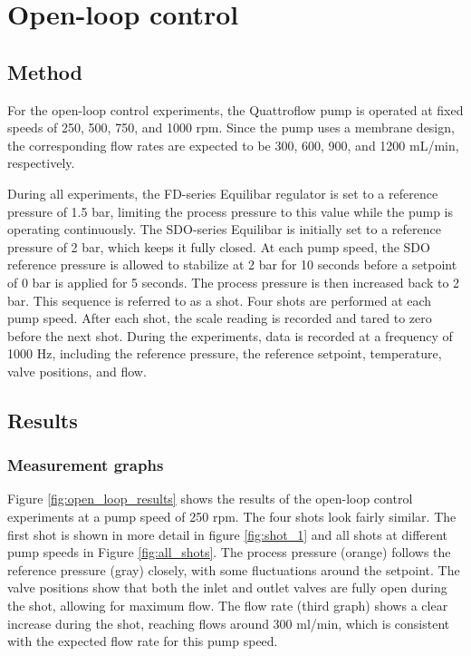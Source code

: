 \documentclass[12pt,a4paper]{article}
\begin{document}
\newpage
\section{Open-loop control}
\subsection{Method}
For the open-loop control experiments, the Quattroflow pump is operated at fixed speeds of 250, 500, 750, and 1000 rpm. Since the pump uses a membrane design, the corresponding flow rates are expected to be 300, 600, 900, and 1200 mL/min, respectively.  

During all experiments, the FD-series Equilibar regulator is set to a reference pressure of 1.5 bar, limiting the process pressure to this value while the pump is operating continuously. The SDO-series Equilibar is initially set to a reference pressure of 2 bar, which keeps it fully closed. At each pump speed, the SDO reference pressure is allowed to stabilize at 2 bar for 10 seconds before a setpoint of 0 bar is applied for 5 seconds. The process pressure is then increased back to 2 bar. This sequence is referred to as a shot. Four shots are performed at each pump speed. After each shot, the scale reading is recorded and tared to zero before the next shot. During the experiments, data is recorded at a frequency of 1000 Hz, including the reference pressure, the reference setpoint, temperature, valve positions, and flow.

\subsection{Results}
\subsubsection{Measurement graphs}
Figure \ref{fig:open_loop_results} shows the results of the open-loop control experiments at a pump speed of 250 rpm. The four shots look fairly similar. The first shot is shown in more detail in figure \ref{fig:shot_1} and all shots at different pump speeds in Figure \ref{fig:all_shots}. The process pressure (orange) follows the reference pressure (gray) closely, with some fluctuations around the setpoint. The valve positions show that both the inlet and outlet valves are fully open during the shot, allowing for maximum flow. The flow rate (third graph) shows a clear increase during the shot, reaching flows around 300 ml/min, which is consistent with the expected flow rate for this pump speed.
\end{document}
